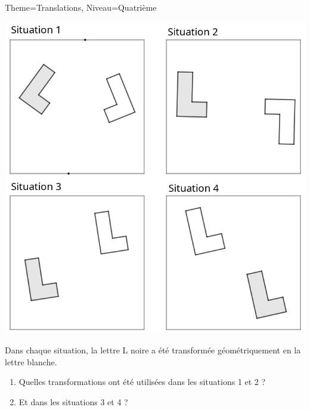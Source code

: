 \documentclass[11pt]{article}
\begin{document}
\begin{Maquette}[Fiche]{Theme=Translations, Niveau=Quatrième}

\begin{exercice}
    \begin{center}
    \includegraphics[width=.75\linewidth]{Images/exercice1.png}
    \end{center}
    Dans chaque situation, la lettre L noire a été transformée géométriquement en la lettre blanche.
    \begin{enumerate}
        \item Quelles transformations ont été utilisées dans les situations 1 et 2 ?
        \item Et dans les situations 3 et 4 ?
    \end{enumerate}
\end{exercice}

\end{Maquette}
\end{document}
